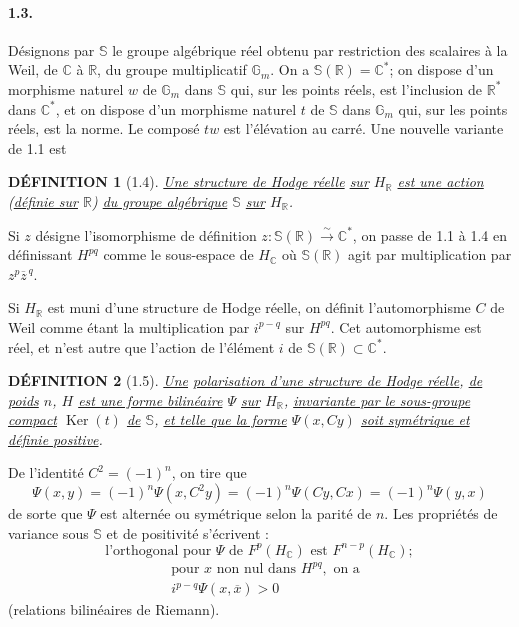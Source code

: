 \documentclass[10pt,leqno]{article}
\newcommand{\C}{\mathbb C}
\newcommand{\R}{\mathbb R}
\newcommand{\Gm}{\mathbb G_m}
\newcommand{\bS}{\mathbb S}
\newcommand{\Ker}{\operatorname{Ker}}
\theoremstyle{deligne}
\newtheorem*{definition}{DÉFINITION}
\renewcommand{\underline}[1]{\uline{#1}}
\begin{document}
\paragraph{1.3.}
Désignons par $\bS$ le groupe algébrique réel obtenu par restriction des scalaires à la Weil, de $\C$ à $\R$, du groupe multiplicatif $\Gm$. On a $\bS(\R)=\C^*$; on dispose d'un morphisme naturel $w$ de $\Gm$ dans $\bS$ qui, sur les points réels, est l'inclusion de $\R^*$ dans $\C^*$, et on dispose d'un morphisme naturel $t$ de $\bS$ dans $\Gm$ qui, sur les points réels, est la norme. Le composé $tw$ est l'élévation au carré. Une nouvelle variante de 1.1 est

\begin{definition}[1.4]
\underline{Une structure de Hodge réelle} \underline{sur} $H_\R$ \underline{est une action} (\underline{définie sur} $\R$) \underline{du groupe algébrique} $\bS$ \underline{sur} $H_\R$.
\end{definition}

Si $z$ désigne l'isomorphisme de définition $z:\bS(\R)\xrightarrow{\sim}\C^*$, on passe de 1.1 à 1.4 en définissant $H^{pq}$ comme le sous-espace de $H_\C$ où $\bS(\R)$ agit par multiplication par $z^p\overline z^{\,q}$.

Si $H_\R$ est muni d'une structure de Hodge réelle, on définit l'automorphisme $C$ de Weil comme étant la multiplication par $i^{p-q}$ sur $H^{pq}$. Cet automorphisme est réel, et n'est autre que l'action de l'élément $i$ de $\bS(\R)\subset\C^*$.

\begin{definition}[1.5]
\underline{Une} \underline{polarisation d'une structure de Hodge réelle}, \underline{de poids} $n$, $H$ \underline{est une forme bilinéaire} $\Psi$ \underline{sur} $H_\R$, \underline{invariante par le sous-groupe compact} $\Ker(t)$ \underline{de} $\bS$, \underline{et telle que la forme} $\Psi(x,Cy)$ \underline{soit symétrique et définie positive}.
\end{definition}

De l'identité $C^2=(-1)^n$, on tire que
\[
\Psi(x,y)=(-1)^n\Psi(x,C^2y)=(-1)^n\Psi(Cy,Cx)=(-1)^n\Psi(y,x)
\]
de sorte que $\Psi$ est alternée ou symétrique selon la parité de $n$. Les propriétés de variance sous $\bS$ et de positivité s'écrivent :
\begin{equation}
\text{l'orthogonal pour }\Psi\text{ de }F^p(H_\C)\text{ est }F^{n-p}(H_\C);\tag{1.5.1}
\end{equation}
\begin{equation}
\begin{aligned}
&\text{pour }x\text{ non nul dans }H^{pq},\text{ on a}\\
&i^{p-q}\Psi(x,\overline x)>0
\end{aligned}
\tag{1.5.2}
\end{equation}
(relations bilinéaires de Riemann).
\end{document}
